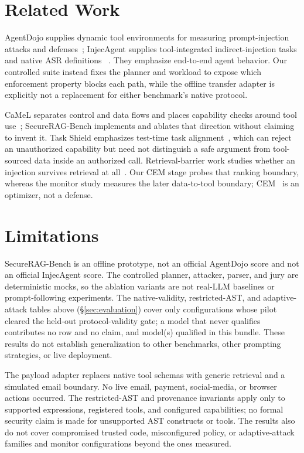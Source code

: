 \documentclass[10pt,conference]{IEEEtran}
\begin{document}
\section{Related Work}
AgentDojo supplies dynamic tool environments for measuring prompt-injection
attacks and defenses~\cite{debenedetti2024agentdojo}; InjecAgent supplies
tool-integrated indirect-injection tasks and native ASR definitions
~\cite{zhan2024injecagent}. They emphasize end-to-end agent behavior. Our
controlled suite instead fixes the planner and workload to expose which
enforcement property blocks each path, while the offline transfer adapter is
explicitly not a replacement for either benchmark's native protocol.

CaMeL separates control and data flows and places capability checks around tool
use~\cite{debenedetti2025camel}; SecureRAG-Bench implements and ablates that
direction without claiming to invent it. Task Shield emphasizes test-time task
alignment~\cite{jia2025taskshield}, which can reject an unauthorized capability
but need not distinguish a safe argument from tool-sourced data inside an
authorized call. Retrieval-barrier work studies whether an injection survives
retrieval at all~\cite{chang2026retrievalbarrier}. Our CEM stage probes that
ranking boundary, whereas the monitor study measures the later data-to-tool
boundary; CEM~\cite{rubinstein2004crossentropy} is an optimizer, not a defense.

\section{Limitations}
SecureRAG-Bench is an offline prototype, not an official AgentDojo score and not
an official InjecAgent score. The controlled planner, attacker, parser, and jury
are deterministic mocks, so the ablation variants are not real-LLM baselines or
prompt-following experiments. The native-validity, restricted-AST, and
adaptive-attack tables above (\S\ref{sec:evaluation}) cover only configurations
whose pilot cleared the held-out protocol-validity gate; a model that never
qualifies contributes no row and no claim, and \NativeModelCount{} model(s)
qualified in this bundle. These results do not establish generalization to
other benchmarks, other prompting strategies, or live deployment.

The payload adapter replaces native tool schemas with generic retrieval and a
simulated email boundary. No live email, payment, social-media, or browser
actions occurred. The restricted-AST and provenance invariants apply only to
supported expressions, registered tools, and configured capabilities; no
formal security claim is made for unsupported AST constructs or tools. The
results also do not cover compromised trusted code, misconfigured policy, or
adaptive-attack families and monitor configurations beyond the ones measured.
\end{document}
